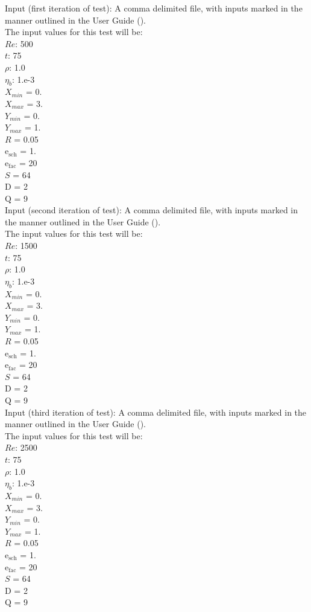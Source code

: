 \documentclass[12pt, titlepage]{article}
\begin{document}
\begin{enumerate}
Input (first iteration of test): A comma delimited file, with inputs marked in
the manner outlined in the User Guide (\citet{LBM_UserGuide_PM}).\\The input
values for this test will be:\\
$Re$: 500\\
$t$: 75\\
$\rho$: 1.0\\
$\eta_b$: 1.e-3\\
$X_{min}$ = 0.\\
$X_{max}$ = 3.\\
$Y_{min}$ = 0.\\
$Y_{max}$ = 1.\\
$R$ = 0.05\\
$\mathrm{e_{sch}}$ = 1.\\
$\mathrm{e_{fac}}$ = 20\\
$S$ = 64\\
$\mathrm{D}$ = 2\\
$\mathrm{Q}$ = 9\\

Input (second iteration of test): A comma delimited file, with inputs marked in
the manner outlined in the User Guide (\citet{LBM_UserGuide_PM}).\\The input
values for this test will be:\\
$Re$: 1500\\
$t$: 75\\
$\rho$: 1.0\\
$\eta_b$: 1.e-3\\
$X_{min}$ = 0.\\
$X_{max}$ = 3.\\
$Y_{min}$ = 0.\\
$Y_{max}$ = 1.\\
$R$ = 0.05\\
$\mathrm{e_{sch}}$ = 1.\\
$\mathrm{e_{fac}}$ = 20\\
$S$ = 64\\
$\mathrm{D}$ = 2\\
$\mathrm{Q}$ = 9\\

Input (third iteration of test): A comma delimited file, with inputs marked in
the manner outlined in the User Guide (\citet{LBM_UserGuide_PM}).\\The input
values for this test will be:\\
$Re$: 2500\\
$t$: 75\\
$\rho$: 1.0\\
$\eta_b$: 1.e-3\\
$X_{min}$ = 0.\\
$X_{max}$ = 3.\\
$Y_{min}$ = 0.\\
$Y_{max}$ = 1.\\
$R$ = 0.05\\
$\mathrm{e_{sch}}$ = 1.\\
$\mathrm{e_{fac}}$ = 20\\
$S$ = 64\\
$\mathrm{D}$ = 2\\
$\mathrm{Q}$ = 9\\


\end{enumerate}
\end{document}
